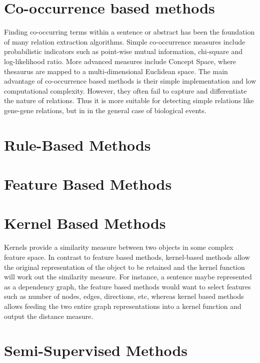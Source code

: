 \section{Co-occurrence based methods}%
Finding co-occurring terms within a sentence or abstract has been the foundation of many relation extraction algorithms\cite{chaussabel2002mining,becker2003pubmatrix,tanabe1999medminer,stapley2000biobibliometrics,jenssen2001literature,wren2004knowledge}. Simple co-occurrence measures include probabilistic indicators such as point-wise mutual information, chi-square and log-likelihood ratio. More advanced measures include Concept Space, where thesaurus are mapped to a multi-dimensional Euclidean space\cite{leroy2005genescene, van2004constructing}. The main advantage of co-occurrence based methods is their simple implementation and low computational complexity. However, they often fail to capture and differentiate the nature of relations. Thus it is more suitable for detecting simple relations like gene-gene relations, but in in the general case of biological events. 
\section{Rule-Based Methods}

\section{Feature Based Methods}  %
\label{section1.3}

\section{Kernel Based Methods} 
Kernels provide a similarity measure between two objects in some complex feature space. In contrast to feature based methods, kernel-based methods allow the original representation of the object to be retained and the kernel function will work out the similarity measure. For instance, a sentence maybe represented as a dependency graph, the feature based methods would want to select features such as number of nodes, edges, directions, etc, whereas kernel based methods allows feeding the two entire graph representations into a kernel function and output the distance measure.
\section{Semi-Supervised Methods}